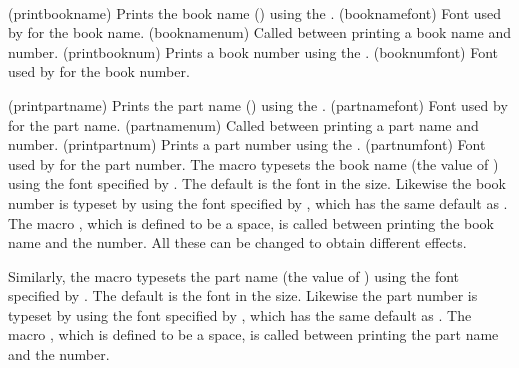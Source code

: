 \begin{syntax}
\cmd{\printbookname} \cmd{\booknamefont} \\
\cmd{\booknamenum} \\
\cmd{\printbooknum} \cmd{\booknumfont} \\
\cmd{\printpartname} \cmd{\partnamefont} \\
\cmd{\partnamenum} \\
\cmd{\printpartnum} \cmd{\partnumfont} \\
\end{syntax}
\glossary(printbookname)%
  {}
  {Prints the book name () using the .}
\glossary(booknamefont)%
  {}%
  {Font used by  for the book name.}
\glossary(booknamenum)%
  {}%
  {Called between printing a book name and number.}
\glossary(printbooknum)%
  {}%
  {Prints a book number using the .}
\glossary(booknumfont)%
  {}%
  {Font used by  for the book number.}

\glossary(printpartname)%
  {}
  {Prints the part name () using the .}
\glossary(partnamefont)%
  {}%
  {Font used by  for the part name.}
\glossary(partnamenum)%
  {}%
  {Called between printing a part name and number.}
\glossary(printpartnum)%
  {}%
  {Prints a part number using the .}
\glossary(partnumfont)%
  {}%
  {Font used by  for the part number.}
The macro \cmd{\printbookname} typesets the book name (the value of 
\cmd{\bookname}) using the font specified by \cmd{\booknamefont}. 
The default is the \cmd{\bfseries} font in the \cmd{\huge} size. 
Likewise the book number is typeset by \cmd{\printbooknum}
using the font specified by \cmd{\booknumfont}, which has the same default as
\cmd{\booknamefont}. The macro \cmd{\booknamenum}, which is defined to be 
a space, is called between printing the book name and the number. All 
these can be changed to obtain different effects. 

    Similarly, the macro \cmd{\printpartname} typesets the part name 
(the value of \cmd{\partname}) using the font specified by 
\cmd{\partnamefont}. The default is the \cmd{\bfseries} font in
the \cmd{\huge} size. Likewise the part number is typeset by 
\cmd{\printpartnum} using the font specified by \cmd{\partnumfont}, 
which has the same default as \cmd{\partnamefont}. The macro 
\cmd{\partnamenum}, which is defined to be a space, is called between printing
the part name and the number. 

